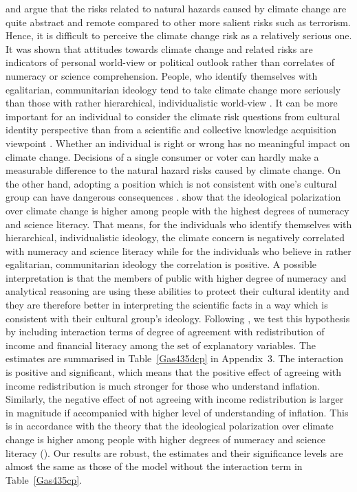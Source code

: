 \documentclass[a4paper,12pt]{article}
\begin{document}
\citet{TerrorClimate} and \citet{KahanEtAl2012} argue that the risks related to natural hazards caused by climate change are quite abstract and remote compared to other more salient risks such as terrorism. Hence, it is difficult to perceive the climate change risk as a relatively serious one. It was shown that attitudes towards climate change and related risks are indicators of personal world-view or political outlook rather than correlates of numeracy or science comprehension. People, who identify themselves with egalitarian, communitarian ideology tend to take climate change more seriously than those with rather hierarchical, individualistic world-view \citep{Leiserowitz2013, KahanEtAl2012, WHITMARSH2011}. It can be more important for an individual to consider the climate risk questions from cultural identity perspective than from a scientific and collective knowledge acquisition viewpoint \citep{Kahan2015}. Whether an individual is right or wrong has no meaningful impact on climate change. Decisions of a single consumer or voter can hardly make a measurable difference to the natural hazard risks caused by climate change. On the other hand, adopting a position which is not consistent with one's cultural group can have dangerous consequences \citep{Kahan2012}. \citet{KahanEtAl2012} show that the ideological polarization over climate change is higher among people with the highest degrees of numeracy and science literacy. That means, for the individuals who identify themselves with hierarchical, individualistic ideology, the climate concern is negatively correlated with numeracy and science literacy while for the individuals who believe in rather egalitarian, communitarian ideology the correlation is positive. A possible interpretation is that the members of public with higher degree of numeracy and analytical reasoning are using these abilities to protect their cultural identity and they are therefore better in interpreting the scientific facts in a way which is consistent with their cultural group's ideology. Following \citet{Hamilton2011}, we test this hypothesis by including interaction terms of degree of agreement with redistribution of income and financial literacy among the set of explanatory variables. The estimates are summarised in Table~\ref{Gas435dcp} in Appendix~$3$. The interaction is positive and significant, which means that the positive effect of agreeing with income redistribution is much stronger for those who understand inflation. Similarly, the negative effect of not agreeing with income redistribution is larger in magnitude if accompanied with higher level of understanding of inflation. This is in accordance with the theory that the ideological polarization over climate change is higher among people with higher degrees of numeracy and science literacy (\citealt{Kahan2012, KahanEtAl2012, Hamilton2011, HamiltonKeim2009}). Our results are robust, the estimates and their significance levels are almost the same as those of the model without the interaction term in Table~\ref{Gas435cp}.
\end{document}
